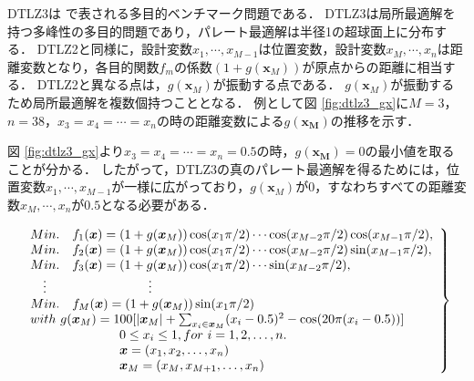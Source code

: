 \documentclass[../main/main]{subfiles}
\begin{document}
DTLZ3は  で表される多目的ベンチマーク問題である．
DTLZ3は局所最適解を持つ多峰性の多目的問題であり，パレート最適解は半径1の超球面上に分布する．
DTLZ2と同様に，設計変数$x_1,\cdots,x_{M-1}$は位置変数，設計変数$x_M,\cdots,x_n$は距離変数となり，各目的関数$f_m$の係数$(1+g(\bm{x}_M))$が原点からの距離に相当する．
DTLZ2と異なる点は，$g(\bm{x}_M)$が振動する点である．
$g(\bm{x}_M)$が振動するため局所最適解を複数個持つこととなる．
例として図  \ref{fig:dtlz3_gx}に$M=3$，$n=38$，$x_3=x_4= \cdots =x_n$の時の距離変数による$g(\bm{x_M})$の推移を示す．

図 \ref{fig:dtlz3_gx}より$x_3=x_4= \cdots =x_n=0.5$の時，$g(\bm{x_M})=0$の最小値を取ることが分かる．
したがって，DTLZ3の真のパレート最適解を得るためには，位置変数$x_1,\cdots,x_{M-1}$が一様に広がっており，$g(\bm{x}_M)$が$0$，すなわちすべての距離変数$x_M,\cdots,x_n$が$0.5$となる必要がある．


\begin{eqnarray} 
\left.
\begin{array}{ll}
Min. \quad f_{1}  (\bm{x}) = (1+g(\bm{x}_{M}))\cos(x_{1}\pi/2)  \cdots  \cos(x_{M-2}\pi/2)\cos(x_{M-1}\pi/2),\\
Min. \quad f_{2} (\bm{x}) = (1+g(\bm{x}_{M}))\cos(x_{1}\pi/2)  \cdots  \cos(x_{M-2}\pi/2)\sin(x_{M-1}\pi/2), \\
Min. \quad f_{3} (\bm{x}) = (1+g(\bm{x}_{M}))\cos(x_{1}\pi/2)  \cdots  \sin(x_{M-2}\pi/2), \\
     \  \  \ $\vdots$    \qquad     \qquad      \qquad     \qquad \vdots \\
Min. \quad f_{M}(\bm{x}) = (1+g(\bm{x}_{M}))\sin(x_{1}\pi/2)\\
with\ g(\bm{x}_{M}) = 100[|\bm{x}_{M}| 
 +\sum_{x_i \in \bm{x}_M} (x_i - 0.5)^2  - \cos(20\pi(x_i-0.5)) ] \\
   \qquad    \qquad   \qquad  \quad  0 \le x_{i} \le 1,  for\ i = 1, 2, \ldots, n. \\
      \qquad    \qquad    \qquad  \quad        \bm x = (x_1,x_2, \ldots, x_n)\\
   \qquad    \qquad    \qquad  \quad        \bm{x}_M = (x_M,x_{M+1}, \ldots, x_n)
   \label{dtlz3} 
\end{array}
\right\}
\end{eqnarray}
\end{document}
